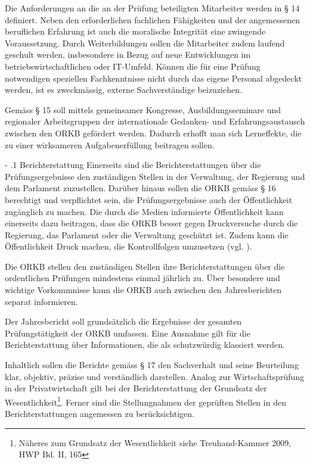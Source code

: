 \documentclass[10pt]{article}
\makeatletter
\renewcommand\paragraph{\@startsection{paragraph}{3}{0mm}{-\baselineskip}{.1\baselineskip}{\normalfont\normalsize\bfseries}}
\renewcommand\paragraph{%
\@startsection{paragraph}{3}{0mm}%
{-\baselineskip}%
{.1\baselineskip}%
{\normalfont\normalsize\bfseries}}
\makeatother
\begin{document}
Die Anforderungen an die an der Prüfung beteiligten Mitarbeiter werden in § 14 definiert. Neben den erforderlichen fachlichen Fähigkeiten und der angemessenen beruflichen Erfahrung ist auch die moralische Integrität eine zwingende Voraussetzung. Durch Weiterbildungen sollen die Mitarbeiter zudem laufend geschult werden, insbesondere in Bezug auf neue Entwicklungen im betriebswirtschaftlichen oder IT-Umfeld. Können die für eine Prüfung notwendigen speziellen Fach­kenntnisse nicht durch das eigene Personal abgedeckt werden, ist es zweckmässig, externe Sachverständige beizuziehen.

Gemäss § 15 soll mittels gemeinsamer Kongresse, Ausbildungsseminare und regionaler Arbeitsgruppen der internationale Gedanken- und Erfahrungs­austausch zwischen den ORKB gefördert werden. Dadurch erhofft man sich Lerneffekte, die zu einer wirksameren Aufgabenerfüllung beitragen sollen.

\paragraph{Berichterstattung}\label{para:berichterstattung}
Einerseits sind die Berichterstattungen über die Prüfungsergebnisse den zuständigen Stellen in der Verwaltung, der Regierung und dem Parlament zuzustellen. Darüber hinaus sollen die ORKB gemäss § 16 berechtigt und verpflichtet sein, die Prüfungsergebnisse auch der Öffentlichkeit zugänglich zu machen. Die durch die Medien informierte Öffentlichkeit kann einerseits dazu beitragen, dass die ORKB besser gegen Druckversuche durch die Regierung, das Parlament oder die Verwaltung geschützt ist. Zudem kann die Öffentlichkeit Druck machen, die Kontrollfolgen umzusetzen (vgl. \cite[622]{Koller2002}).

Die ORKB stellen den zuständigen Stellen ihre Berichterstattungen über die ordentlichen Prüfungen mindestens einmal jährlich zu. Über besondere und wichtige Vorkommnisse kann die ORKB auch zwischen den Jahresberichten separat informieren.

Der Jahresbericht soll grundsätzlich die Ergebnisse der gesamten Prüfungstätigkeit der ORKB umfassen. Eine Ausnahme gilt für die Berichterstattung über Informationen, die als schutzwürdig klassiert werden.

Inhaltlich sollen die Berichte gemäss § 17 den Sachverhalt und seine Beurteilung klar, objektiv, präzise und verständlich darstellen. Analog zur Wirtschaftsprüfung in der Privatwirtschaft gilt bei der Berichterstattung der Grundsatz der Wesentlichkeit\footnote{Näheres zum Grundsatz der Wesentlichkeit siehe Treuhand-Kammer 2009, HWP Bd. II, 165}. Ferner sind die Stellungnahmen der geprüften Stellen in den Berichterstattungen angemessen zu berücksichtigen.
\end{document}
